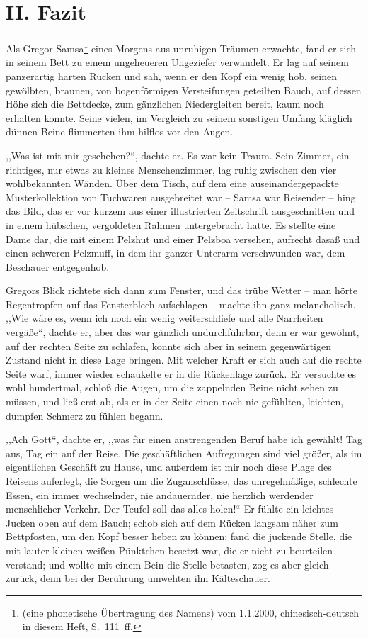 \documentclass[]{zchinr}
\begin{document}
\section{II. Fazit}

Als Gregor Samsa\footnote{ (eine phonetische Übertragung des Namens) vom 1.1.2000, chinesisch-deutsch in diesem Heft, S.~111~ff.} eines Morgens aus unruhigen Träumen erwachte, fand er sich in seinem Bett zu einem ungeheueren Ungeziefer verwandelt. Er lag auf seinem panzerartig harten Rücken und sah, wenn er den Kopf ein wenig hob, seinen gewölbten, braunen, von bogenförmigen Versteifungen geteilten Bauch, auf dessen Höhe sich die Bettdecke, zum gänzlichen Niedergleiten bereit, kaum noch erhalten konnte. Seine vielen, im Vergleich zu seinem sonstigen Umfang kläglich dünnen Beine flimmerten ihm hilflos vor den Augen.

,,Was ist mit mir geschehen?{}``, dachte er. Es war kein Traum. Sein Zimmer, ein richtiges, nur etwas zu kleines Menschenzimmer, lag ruhig zwischen den vier wohlbekannten Wänden. Über dem Tisch, auf dem eine auseinandergepackte Musterkollektion von Tuchwaren ausgebreitet war -- Samsa war Reisender -- hing das Bild, das er vor kurzem aus einer illustrierten Zeitschrift ausgeschnitten und in einem hübschen, vergoldeten Rahmen untergebracht hatte. Es stellte eine Dame dar, die mit einem Pelzhut und einer Pelzboa versehen, aufrecht dasaß und einen schweren Pelzmuff, in dem ihr ganzer Unterarm verschwunden war, dem Beschauer entgegenhob.

Gregors Blick richtete sich dann zum Fenster, und das trübe Wetter -- man hörte Regentropfen auf das Fensterblech aufschlagen -- machte ihn ganz melancholisch. ,,Wie wäre es, wenn ich noch ein wenig weiterschliefe und alle Narrheiten vergäße``, dachte er, aber das war gänzlich undurchführbar, denn er war gewöhnt, auf der rechten Seite zu schlafen, konnte sich aber in seinem gegenwärtigen Zustand nicht in diese Lage bringen. Mit welcher Kraft er sich auch auf die rechte Seite warf, immer wieder schaukelte er in die Rückenlage zurück. Er versuchte es wohl hundertmal, schloß die Augen, um die zappelnden Beine nicht sehen zu müssen, und ließ erst ab, als er in der Seite einen noch nie gefühlten, leichten, dumpfen Schmerz zu fühlen begann.

,,Ach Gott``, dachte er, ,,was für einen anstrengenden Beruf habe ich gewählt! Tag aus, Tag ein auf der Reise. Die geschäftlichen Aufregungen sind viel größer, als im eigentlichen Geschäft zu Hause, und außerdem ist mir noch diese Plage des Reisens auferlegt, die Sorgen um die Zuganschlüsse, das unregelmäßige, schlechte Essen, ein immer wechselnder, nie andauernder, nie herzlich werdender menschlicher Verkehr. Der Teufel soll das alles holen!{}`` Er fühlte ein leichtes Jucken oben auf dem Bauch; schob sich auf dem Rücken langsam näher zum Bettpfosten, um den Kopf besser heben zu können; fand die juckende Stelle, die mit lauter kleinen weißen Pünktchen besetzt war, die er nicht zu beurteilen verstand; und wollte mit einem Bein die Stelle betasten, zog es aber gleich zurück, denn bei der Berührung umwehten ihn Kälteschauer.
\end{document}
